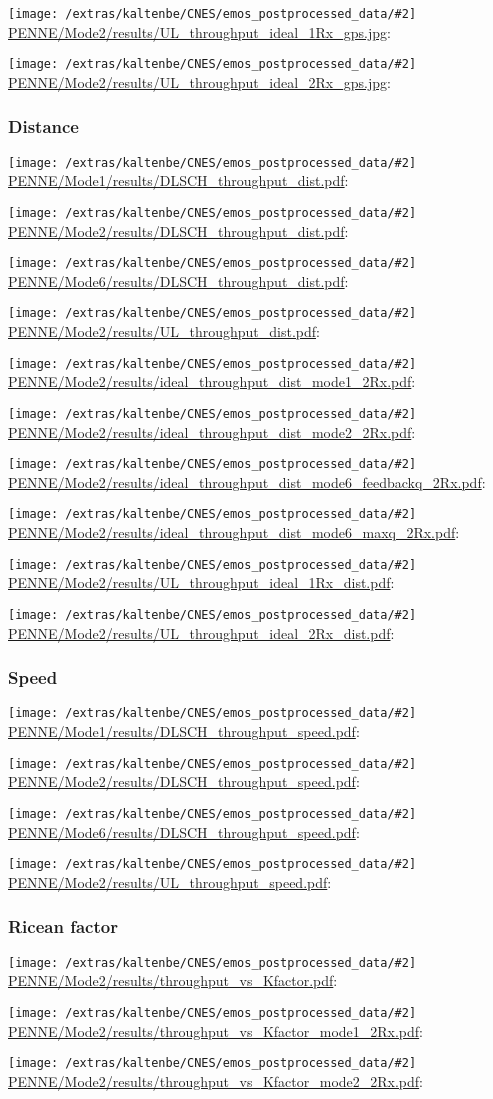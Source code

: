 \documentclass[a4paper,10pt]{article}
\newcommand{\printfile}[2][]{
 \begin{minipage}{8cm}
  \centering
  \texttt{[image: /extras/kaltenbe/CNES/emos\_postprocessed\_data/\#2]}
  \url{#2}: #1

 \end{minipage}
}
\begin{document}
\printfile{PENNE/Mode2/results/UL_throughput_ideal_1Rx_gps.jpg}
\printfile{PENNE/Mode2/results/UL_throughput_ideal_2Rx_gps.jpg}

\subsubsection{Distance}

\printfile{PENNE/Mode1/results/DLSCH_throughput_dist.pdf}
\printfile{PENNE/Mode2/results/DLSCH_throughput_dist.pdf}

\printfile{PENNE/Mode6/results/DLSCH_throughput_dist.pdf}
\printfile{PENNE/Mode2/results/UL_throughput_dist.pdf}


\printfile{PENNE/Mode2/results/ideal_throughput_dist_mode1_2Rx.pdf}
%
\printfile{PENNE/Mode2/results/ideal_throughput_dist_mode2_2Rx.pdf}

\printfile{PENNE/Mode2/results/ideal_throughput_dist_mode6_feedbackq_2Rx.pdf}
%
\printfile{PENNE/Mode2/results/ideal_throughput_dist_mode6_maxq_2Rx.pdf}

\printfile{PENNE/Mode2/results/UL_throughput_ideal_1Rx_dist.pdf}
\printfile{PENNE/Mode2/results/UL_throughput_ideal_2Rx_dist.pdf}

\subsubsection{Speed}

\printfile{PENNE/Mode1/results/DLSCH_throughput_speed.pdf}
\printfile{PENNE/Mode2/results/DLSCH_throughput_speed.pdf}

\printfile{PENNE/Mode6/results/DLSCH_throughput_speed.pdf}
\printfile{PENNE/Mode2/results/UL_throughput_speed.pdf}

\subsubsection{Ricean factor}

\printfile{PENNE/Mode2/results/throughput_vs_Kfactor.pdf}

\printfile{PENNE/Mode2/results/throughput_vs_Kfactor_mode1_2Rx.pdf}
\printfile{PENNE/Mode2/results/throughput_vs_Kfactor_mode2_2Rx.pdf}
\end{document}
